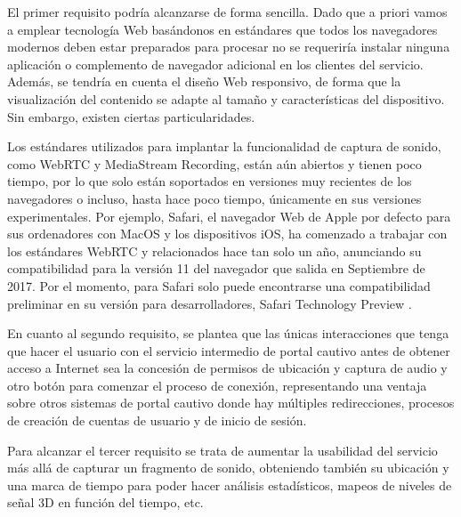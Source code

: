 El primer requisito podría alcanzarse de forma sencilla. Dado que a priori vamos a emplear tecnología Web basándonos en estándares que todos los navegadores modernos deben estar preparados para procesar no se requeriría instalar ninguna aplicación o complemento de navegador adicional en los clientes del servicio. Además, se tendría en cuenta el diseño Web responsivo, de forma que la visualización del contenido se adapte al tamaño y características del dispositivo. Sin embargo, existen ciertas particularidades.

Los estándares utilizados para implantar la funcionalidad de captura de sonido, como WebRTC y MediaStream Recording, están aún abiertos y tienen poco tiempo, por lo que solo están soportados en versiones muy recientes de los navegadores o incluso, hasta hace poco tiempo, únicamente en sus versiones experimentales. Por ejemplo, Safari, el navegador Web de Apple por defecto para sus ordenadores con MacOS y los dispositivos iOS, ha comenzado a trabajar con los estándares WebRTC y relacionados hace tan solo un año, anunciando su compatibilidad para la versión 11 del navegador que salida en Septiembre de 2017. Por el momento, para Safari solo puede encontrarse una compatibilidad preliminar en su versión para desarrolladores, Safari Technology Preview \cite{SafariWebRTC}.

En cuanto al segundo requisito, se plantea que las únicas interacciones que tenga que hacer el usuario con el servicio intermedio de portal cautivo antes de obtener acceso a Internet sea la concesión de permisos de ubicación y captura de audio y otro botón para comenzar el proceso de conexión, representando una ventaja sobre otros sistemas de portal cautivo donde hay múltiples redirecciones, procesos de creación de cuentas de usuario y de inicio de sesión.

Para alcanzar el tercer requisito se trata de aumentar la usabilidad del servicio más allá de capturar un fragmento de sonido, obteniendo también su ubicación y una marca de tiempo para poder hacer análisis estadísticos, mapeos de niveles de señal 3D en función del tiempo, etc.

